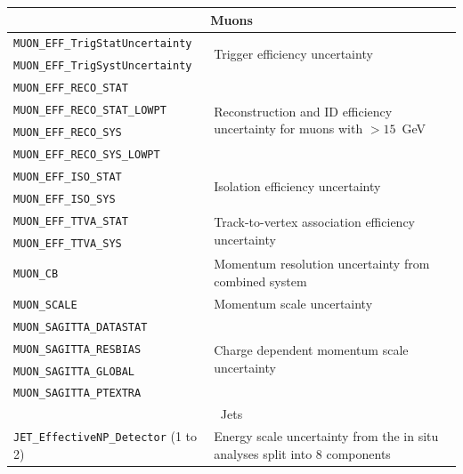 \begin{table}
{\begin{tabular}{l|l}
  \hline
  \multicolumn{2}{c}{Muons} \\
  \hline
  \texttt{MUON\_EFF\_TrigStatUncertainty} &  \multirow{2}{*}{Trigger efficiency uncertainty} \\
  \texttt{MUON\_EFF\_TrigSystUncertainty} &                                                  \\
  \texttt{MUON\_EFF\_RECO\_STAT} &  \multirow{4}{*}{Reconstruction and ID efficiency uncertainty for muons with \pt{} $> 15$~GeV} \\
  \texttt{MUON\_EFF\_RECO\_STAT\_LOWPT} &                                                                      \\
  \texttt{MUON\_EFF\_RECO\_SYS} &                                                                      \\
  \texttt{MUON\_EFF\_RECO\_SYS\_LOWPT} &                                                                      \\
  \texttt{MUON\_EFF\_ISO\_STAT} &  \multirow{2}{*}{Isolation efficiency uncertainty}                   \\
  \texttt{MUON\_EFF\_ISO\_SYS} &                                                                      \\
  \texttt{MUON\_EFF\_TTVA\_STAT} &  \multirow{2}{*}{Track-to-vertex association efficiency uncertainty} \\
  \texttt{MUON\_EFF\_TTVA\_SYS} &                                                                      \\
  \texttt{MUON\_CB} & Momentum resolution uncertainty from combined system                  \\
  \texttt{MUON\_SCALE} & Momentum scale uncertainty                                           \\
  \texttt{MUON\_SAGITTA\_DATASTAT} & \multirow{4}{*}{Charge dependent momentum scale uncertainty}         \\
  \texttt{MUON\_SAGITTA\_RESBIAS} &                                                                       \\
  \texttt{MUON\_SAGITTA\_GLOBAL} &                                                                       \\
  \texttt{MUON\_SAGITTA\_PTEXTRA} &                                                                       \\
  \hline
  \multicolumn{2}{c}{Jets} \\
  \hline
  \texttt{JET\_EffectiveNP\_Detector} (1 to 2)          & \multirow{4}{*}{Energy scale uncertainty from the in situ analyses split into 8 components} \\

\end{tabular}}
\end{table}

